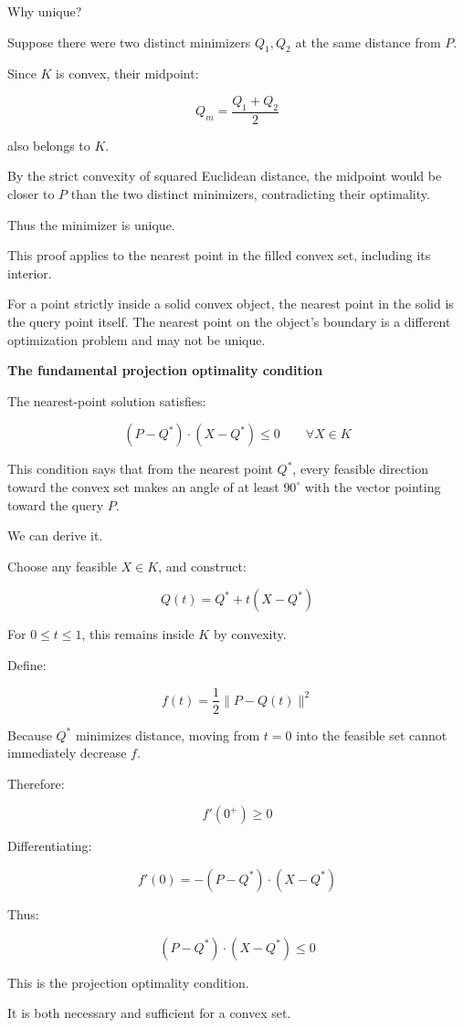 Why unique?

Suppose there were two distinct minimizers \(Q_1,Q_2\) at the same distance from \(P\).

Since \(K\) is convex, their midpoint:

\[
Q_m=\frac{Q_1+Q_2}{2}
\]

also belongs to \(K\).

By the strict convexity of squared Euclidean distance, the midpoint would be closer to \(P\) than the two distinct minimizers, contradicting their optimality.

Thus the minimizer is unique.

This proof applies to the nearest point in the filled convex set, including its interior.

For a point strictly inside a solid convex object, the nearest point in the solid is the query point itself. The nearest point on the object's boundary is a different optimization problem and may not be unique.

\textbf{The fundamental projection optimality condition}

The nearest-point solution satisfies:

\[
\boxed{ (P-Q^*)\cdot(X-Q^*)\le0 \qquad\forall X\in K }
\]

This condition says that from the nearest point \(Q^*\), every feasible direction toward the convex set makes an angle of at least \(90^\circ\) with the vector pointing toward the query \(P\).

We can derive it.

Choose any feasible \(X\in K\), and construct:

\[
Q(t)=Q^*+t(X-Q^*)
\]

For \(0\le t\le1\), this remains inside \(K\) by convexity.

Define:

\[
f(t)=\frac12\|P-Q(t)\|^2
\]

Because \(Q^*\) minimizes distance, moving from \(t=0\) into the feasible set cannot immediately decrease \(f\).

Therefore:

\[
f'(0^+)\ge0
\]

Differentiating:

\[
f'(0)=-(P-Q^*)\cdot(X-Q^*)
\]

Thus:

\[
(P-Q^*)\cdot(X-Q^*)\le0
\]

This is the projection optimality condition.

It is both necessary and sufficient for a convex set.

